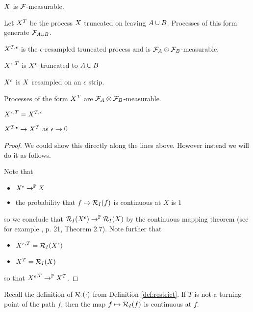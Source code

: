 {$X$ is $\mathcal{F}$-measurable.

\newcommand{\sampledT}{\sampled^T}
\newcommand{\sampledTe}{\sampled^{T,\epsilon}}
\newcommand{\resampledeT}{{\resamplede}^{,T}}

Let $\sampledT$ be the process $X$ truncated on leaving
$A \cup B$.  Processes of this form generate $\mathcal{F}_{A \cup B}$.

$\sampledTe$ is the $\epsilon$-resampled truncated process and is
$\mathcal{F}_A \otimes \mathcal{F}_B$-measurable.

$\resampledeT$ is $X^{\epsilon}$ truncated to $A \cup B$

$X^{\epsilon}$ is $X$ resampled on an $\epsilon$ strip.

\begin{obs}
  Processes of the form $\sampledT$ are $\mathcal{F}_A \otimes
  \mathcal{F}_B$-measurable.
\end{obs}

\begin{lemma}
  $\resampledeT = \sampledTe$
\end{lemma}

\begin{lemma}
  $\sampledTe \to \sampledT$ as $\epsilon \to 0$
\end{lemma}

\begin{proof}
  We could show this directly along the lines above.  However instead
  we will do it as follows.

  Note that
  \begin{itemize}
  \item $X^{\epsilon} \to^{\mathbb{P}} X$
  \item the probability that $f \mapsto \mathcal{R}_{I}(f)$ is continuous
    at $X$ is $1$
  \end{itemize}
  so we conclude that $\mathcal{R}_{I}(X^{\epsilon}) \to^{\mathbb{P}}
  \mathcal{R}_{I}(X)$ by the continuous mapping theorem (see for
  example \cite{billingsley}, p. 21, Theorem 2.7). Note further that
  \begin{itemize}
  \item $\resampledeT = \restrict{I}{\resamplede}$
  \item $\sampledT = \restrict{I}{\sampled}$
  \end{itemize}
  so that $\resampledeT \to^\P \sampledT$.
\end{proof}

\begin{lemma}
  Recall the definition of $\mathcal{R}_{\cdot}(\cdot)$ from Definition
  \ref{def:restrict}.  If $T$ is not a turning point of the path $f$,
  then the map $f \mapsto \mathcal{R}_{I}(f)$ is continuous at $f$.
\end{lemma}

}
